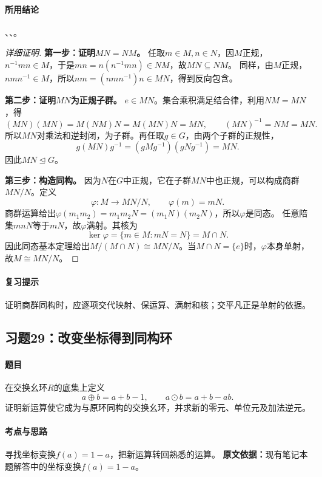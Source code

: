 \paragraph{所用结论}
、、。
\begin{proof}[详细证明]
\textbf{第一步：证明$MN=NM$。}
任取$m\in M,n\in N$，因$M$正规，$n^{-1}mn\in M$，于是$mn=n(n^{-1}mn)\in NM$，故$MN\subseteq NM$。
同样，由$M$正规，$nmn^{-1}\in M$，所以$nm=(nmn^{-1})n\in MN$，得到反向包含。

\textbf{第二步：证明$MN$为正规子群。}
$e\in MN$。集合乘积满足结合律，利用$NM=MN$，得
\[
(MN)(MN)=M(NM)N=M(MN)N=MN,
\qquad (MN)^{-1}=NM=MN.
\]
所以$MN$对乘法和逆封闭，为子群。再任取$g\in G$，由两个子群的正规性，
\[
g(MN)g^{-1}=(gMg^{-1})(gNg^{-1})=MN.
\]
因此$MN\trianglelefteq G$。

\textbf{第三步：构造同构。}
因为$N$在$G$中正规，它在子群$MN$中也正规，可以构成商群$MN/N$。定义
\[
\varphi:M\longrightarrow MN/N,\qquad \varphi(m)=mN.
\]
商群运算给出$\varphi(m_1m_2)=m_1m_2N=(m_1N)(m_2N)$，所以$\varphi$是同态。
任意陪集$mnN$等于$mN$，故$\varphi$满射。其核为
\[
\ker\varphi=\{m\in M:mN=N\}=M\cap N.
\]
因此同态基本定理给出$M/(M\cap N)\cong MN/N$。当$M\cap N=\{e\}$时，$\varphi$本身单射，故$M\cong MN/N$。
\end{proof}
\paragraph{复习提示}
证明商群同构时，应逐项交代映射、保运算、满射和核；交平凡正是单射的依据。

\subsection{习题29：改变坐标得到同构环}
\paragraph{题目}
在交换幺环$R$的底集上定义
\[
a\oplus b=a+b-1,\qquad a\odot b=a+b-ab.
\]
证明新运算使它成为与原环同构的交换幺环，并求新的零元、单位元及加法逆元。
\paragraph{考点与思路}
寻找坐标变换$f(a)=1-a$，把新运算转回熟悉的运算。
\textbf{原文依据：}现有笔记本题解答中的坐标变换$f(a)=1-a$。

